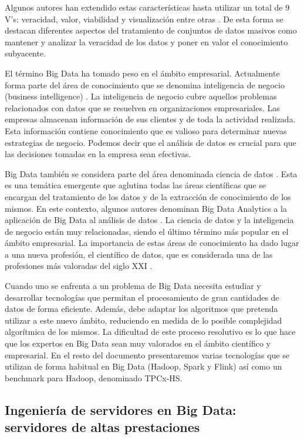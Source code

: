 \documentclass[10pt]{article}
\begin{document}
		Algunos autores han extendido estas características hasta utilizar un total de 9 V's: veracidad, valor, viabilidad y visualización entre otras \cite{understanding-big-data}. De esta forma se destacan diferentes aspectos del tratamiento de conjuntos de datos masivos como mantener y analizar la veracidad de los datos y poner en valor el conocimiento subyacente.
	
		El término Big Data ha tomado peso en el ámbito empresarial. Actualmente forma parte del área de conocimiento que se denomina inteligencia de negocio (business intelligence) \cite{business-intelligence}. La inteligencia de negocio cubre aquellos problemas relacionados con datos que se resuelven en organizaciones empresariales. Las empresas almacenan información de sus clientes y de toda la actividad realizada. Esta información contiene conocimiento que es valioso para determinar nuevas estrategias de negocio. Podemos decir que el análisis de datos es crucial para que las decisiones tomadas en la empresa sean efectivas. 
	
		Big Data también se considera parte del área denominada ciencia de datos \cite{data-science}. Esta es una temática emergente que aglutina todas las áreas científicas que se encargan del tratamiento de los datos y de la extracción de conocimiento de los mismos. En este contexto, algunos autores denominan Big Data Analytics a la aplicación de Big Data al análisis de datos \cite{big-data-trends}. La ciencia de datos y la inteligencia de negocio están muy relacionadas, siendo el último término más popular en el ámbito empresarial. La importancia de estas áreas de conocimiento ha dado lugar a una nueva profesión, el científico de datos, que es considerada una de las profesiones más valoradas del siglo XXI \cite{data-scientist}.
		
		Cuando uno se enfrenta a un problema de Big Data necesita estudiar y desarrollar tecnologías que permitan el procesamiento de gran cantidades de datos de forma eficiente. Además, debe adaptar los algoritmos que pretenda utilizar a este nuevo ámbito, reduciendo en medida de lo posible complejidad algorítmica de los mismos. La dificultad de este proceso resolutivo es lo que hace que los expertos en Big Data sean muy valorados en el ámbito científico y empresarial. En el resto del documento presentaremos varias tecnologías que se utilizan de forma habitual en Big Data (Hadoop, Spark y Flink) así como un benchmark para Hadoop, denominado TPCx-HS.
		
	\subsection{Ingeniería de servidores en Big Data: servidores de altas prestaciones} \label{sec:big-data:ise}
	
\end{document}
